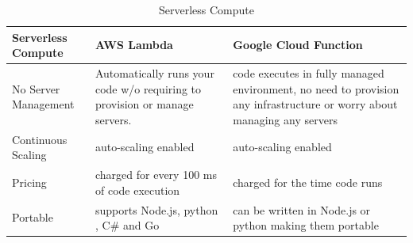 \begin{table}[ht]
\caption{Serverless Compute} %
\centering %
\begin{tabular}{>{\centering\arraybackslash}m{3.7cm}|>{\centering\arraybackslash}m{3.7cm}|>{\centering\arraybackslash}m{3.7cm}} %
\hline\hline %
Serverless Compute & AWS Lambda & Google Cloud Function \\ [0.5ex] %
\hline %
No Server Management & Automatically runs your code w/o requiring to provision or manage servers. & code executes in fully managed environment, no need to provision any infrastructure or worry about managing any servers \\ %
\hline
Continuous Scaling & auto-scaling enabled & auto-scaling enabled \\
\hline
Pricing & charged for every 100 ms of code execution & charged for the time code runs \\
\hline
Portable & supports Node.js, python , C\# and Go & can be written in Node.js or python making them portable \\ [1ex] %
\hline %
\end{tabular}
\label{table:nonlin} %
\end{table}